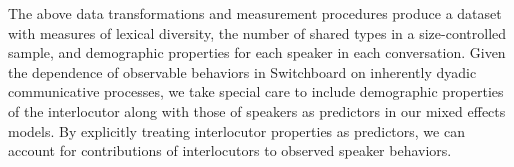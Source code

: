\documentclass[10pt,letterpaper]{article}
\begin{document}
The above data transformations and measurement procedures produce a dataset with measures of lexical diversity, the number of shared types in a size-controlled sample, and demographic properties for each speaker in each conversation.
Given the dependence of observable behaviors in Switchboard on inherently dyadic communicative processes, we take special care to include demographic properties of the interlocutor along with those of speakers as predictors in our mixed effects models.
By explicitly treating interlocutor properties as predictors, we can account for contributions of interlocutors to observed speaker behaviors.


\end{document}

